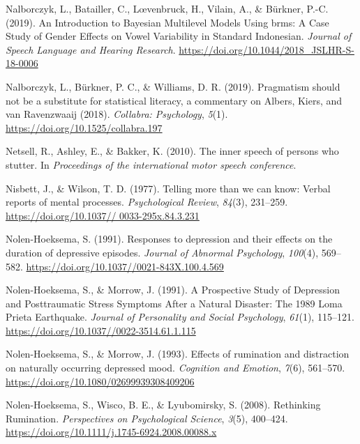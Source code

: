 \documentclass[a4paper,12pt,twoside,openright,oldfontcommands]{memoir}
\begin{document}
\hypertarget{ref-nalborczyk_introduction_2019}{}
Nalborczyk, L., Batailler, C., Lœvenbruck, H., Vilain, A., \& Bürkner,
P.-C. (2019). An Introduction to Bayesian Multilevel Models Using brms:
A Case Study of Gender Effects on Vowel Variability in Standard
Indonesian. \emph{Journal of Speech Language and Hearing Research}.
\url{https://doi.org/10.1044/2018_JSLHR-S-18-0006}

\hypertarget{ref-nalborczyk_pragmatism_2019}{}
Nalborczyk, L., Bürkner, P. C., \& Williams, D. R. (2019). Pragmatism
should not be a substitute for statistical literacy, a commentary on
Albers, Kiers, and van Ravenzwaaij (2018). \emph{Collabra: Psychology},
\emph{5}(1). \url{https://doi.org/10.1525/collabra.197}

\hypertarget{ref-netsell_inner_2010}{}
Netsell, R., Ashley, E., \& Bakker, K. (2010). The inner speech of
persons who stutter. In \emph{Proceedings of the international motor
speech conference}.

\hypertarget{ref-nisbett_telling_1977}{}
Nisbett, J., \& Wilson, T. D. (1977). Telling more than we can know:
Verbal reports of mental processes. \emph{Psychological Review},
\emph{84}(3), 231--259.
\href{https://doi.org/10.1037//\%200033-295x.84.3.231}{https://doi.org/10.1037// 0033-295x.84.3.231}

\hypertarget{ref-nolen-hoeksema_responses_1991}{}
Nolen-Hoeksema, S. (1991). Responses to depression and their effects on
the duration of depressive episodes. \emph{Journal of Abnormal
Psychology}, \emph{100}(4), 569--582.
\url{https://doi.org/10.1037//0021-843X.100.4.569}

\hypertarget{ref-nolen-hoeksema_prospective_1991}{}
Nolen-Hoeksema, S., \& Morrow, J. (1991). A Prospective Study of
Depression and Posttraumatic Stress Symptoms After a Natural Disaster:
The 1989 Loma Prieta Earthquake. \emph{Journal of Personality and Social
Psychology}, \emph{61}(1), 115--121.
\url{https://doi.org/10.1037//0022-3514.61.1.115}

\hypertarget{ref-nolen-hoeksema_effects_1993}{}
Nolen-Hoeksema, S., \& Morrow, J. (1993). Effects of rumination and
distraction on naturally occurring depressed mood. \emph{Cognition and
Emotion}, \emph{7}(6), 561--570.
\url{https://doi.org/10.1080/02699939308409206}

\hypertarget{ref-Nolen-Hoeksema2008}{}
Nolen-Hoeksema, S., Wisco, B. E., \& Lyubomirsky, S. (2008). Rethinking
Rumination. \emph{Perspectives on Psychological Science}, \emph{3}(5),
400--424. \url{https://doi.org/10.1111/j.1745-6924.2008.00088.x}
\end{document}

